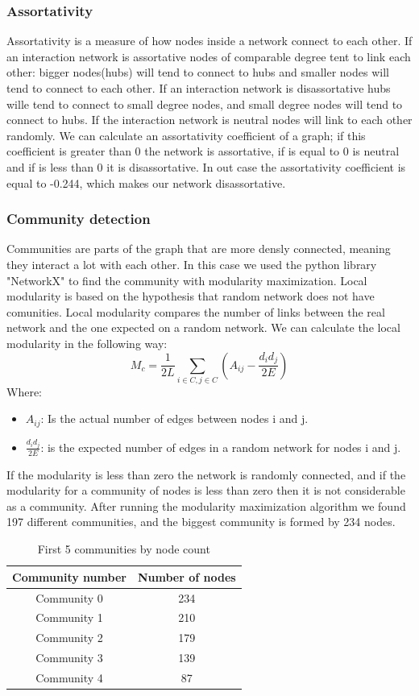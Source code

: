 \documentclass[12pt,journal,compsoc]{IEEEtran}
\begin{document}
\subsubsection{Assortativity}
Assortativity is a measure of how nodes inside a network connect to each other. If an interaction network is assortative nodes of comparable degree tent to link each other: bigger nodes(hubs) will tend to connect to hubs and smaller nodes will tend to connect to each other. If an interaction network is disassortative hubs wille tend to connect to small degree nodes, and small degree nodes will tend to connect to hubs. If the interaction network is neutral nodes will link to each other randomly.
We can calculate an assortativity coefficient of a graph; if this coefficient is greater than 0 the network is assortative, if is equal to 0 is neutral and if is less than 0 it is disassortative.
In out case the assortativity coefficient is equal to -0.244, which makes our network disassortative.

\subsubsection{Community detection}
Communities are parts of the graph that are more densly connected, meaning they interact a lot with each other. In this case we used the python library "NetworkX\cite{NetworkX}" to find the community with modularity maximization. Local modularity is based on the hypothesis that random network does not have comunities. Local modularity\cite{Modularity} compares the number of links between the real network and the one expected on a random network. We can calculate the local modularity in the following way:
\[M_c = \frac{1}{2L}\sum_{i \in C, j\in C }(A_{ij} - \frac{d_id_j}{2E})\] 
Where:
\begin{itemize}[]
    \item $A_{ij}$: Is the actual number of edges between nodes i and j.
    \item $\frac{d_id_j}{2E}$: is the expected number of edges in a random network for nodes i and j.
\end{itemize}
If the modularity is less than zero the network is randomly connected, and if the modularity for a community of nodes is less than zero then it is not considerable as a community.
After running the modularity maximization algorithm we found 197 different communities, and the biggest community is formed by 234 nodes.
\begin{table}[ht]
	\centering
	\begin{tabular}{c c }
		Community number & Number of nodes  \\
		\hline
		Community 0& 234  \\
		Community 1& 210  \\
		Community 2& 179  \\
		Community 3& 139  \\
		Community 4& 87  \\
	\end{tabular}
	\caption{First 5 communities by node count}
	\end{table}
\end{document}
